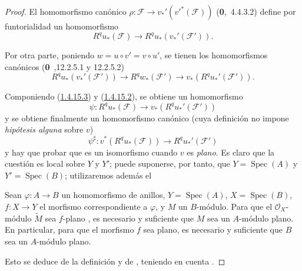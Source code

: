 \begin{proof}
El homomorfismo canónico
$\rho:\mathcal F\to v_*'(v'^*(\mathcal F))$ (\textbf{0},~4.4.3.2) define por funtorialidad un homomorfismo
\begin{equation}
\label{III.1.4.15.2-fr}
\tag{1.4.15.2}
R^qu_*(\mathcal F)\longrightarrow R^qu_*(v_*'(\mathcal F')).
\end{equation}

Por otra parte, poniendo $w=u\circ v'=v\circ u'$, se tienen los homomorfismos canónicos (\textbf{0}~,12.2.5.1 y 12.2.5.2)
\begin{equation}
\label{III.1.4.15.3-fr}
\tag{1.4.15.3}
R^qu_*(v_*'(\mathcal F'))\longrightarrow R^qw_*(\mathcal F')
\longrightarrow v_*(R^qu_*'(\mathcal F')).
\end{equation}

Componiendo (\hyperref[III.1.4.15.3]{1.4.15.3}) y (\hyperref[III.1.4.15.2]{1.4.15.2}), se obtiene un homomorfismo
\[
\psi:R^qu_*(\mathcal F)\longrightarrow v_*(R^qu_*'(\mathcal F'))
\]
y se obtiene finalmente un homomorfismo canónico (cuya definición no impone \emph{hipótesis alguna} sobre $v$)
\begin{equation}
\label{III.1.4.15.4-fr}
\tag{1.4.15.4}
\psi^\sharp:v^*(R^qu_*(\mathcal F))\longrightarrow R^qu_*'(\mathcal F')
\end{equation}
y hay que probar que es un isomorfismo cuando $v$ es \emph{plano}.
Es claro que la cuestión es local sobre $Y$ y $Y'$; puede suponerse, por tanto, que $Y=\operatorname{Spec}(A)$ y $Y'=\operatorname{Spec}(B)$; utilizaremos además el
\begin{lemma}[1.4.15.5]
\label{III.1.4.15.5-fr}
Sean $\varphi:A\to B$ un homomorfismo de anillos, $Y=\operatorname{Spec}(A)$, $X=\operatorname{Spec}(B)$, $f:X\to Y$ el morfismo correspondiente a $\varphi$, y $M$ un $B$-módulo.
Para que el $\mathcal O_X$-módulo $\widetilde M$ sea $f$-plano , es necesario y suficiente que $M$ sea un $A$-módulo plano.
En particular, para que el morfismo $f$ sea plano, es necesario y suficiente que $B$ sea un $A$-módulo plano.
\end{lemma}

Esto se deduce de la definición  y de , teniendo en cuenta .


\end{proof}
